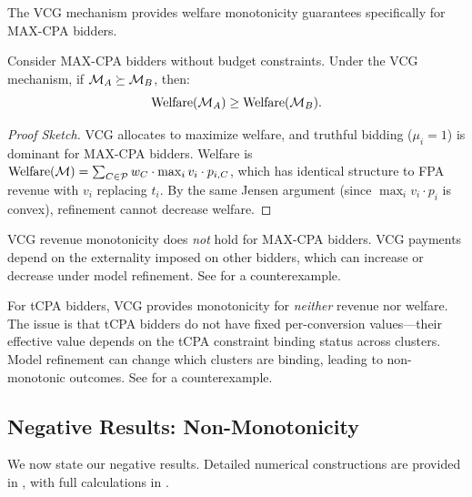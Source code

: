 The VCG mechanism provides welfare monotonicity guarantees specifically for MAX-CPA bidders.

\begin{theorem}
\label{thm:vcg-welfare}
Consider MAX-CPA bidders without budget constraints. Under the VCG mechanism, if $\mathcal{M}_A \succeq \mathcal{M}_B$, then:
\begin{equation}
\text{Welfare}(\mathcal{M}_A) \geq \text{Welfare}(\mathcal{M}_B).
\end{equation}
\end{theorem}

\begin{proof}[Proof Sketch]
VCG allocates to maximize welfare, and truthful bidding ($\mu_i = 1$) is dominant for MAX-CPA bidders. Welfare is $\text{Welfare}(\mathcal{M}) = \sum_{C \in \mathcal{P}} w_C \cdot \max_i v_i \cdot p_{i,C}$, which has identical structure to FPA revenue with $v_i$ replacing $t_i$. By the same Jensen argument (since $\max_i v_i \cdot p_i$ is convex), refinement cannot decrease welfare.
\end{proof}

\begin{remark}
VCG revenue monotonicity does \emph{not} hold for MAX-CPA bidders. VCG payments depend on the externality imposed on other bidders, which can increase or decrease under model refinement. See  for a counterexample.
\end{remark}

\begin{remark}
For tCPA bidders, VCG provides monotonicity for \emph{neither} revenue nor welfare. The issue is that tCPA bidders do not have fixed per-conversion values---their effective value depends on the tCPA constraint binding status across clusters. Model refinement can change which clusters are binding, leading to non-monotonic outcomes. See  for a counterexample.
\end{remark}

\subsection{Negative Results: Non-Monotonicity}
\label{subsec:negative-results}

We now state our negative results. Detailed numerical constructions are provided in , with full calculations in .

